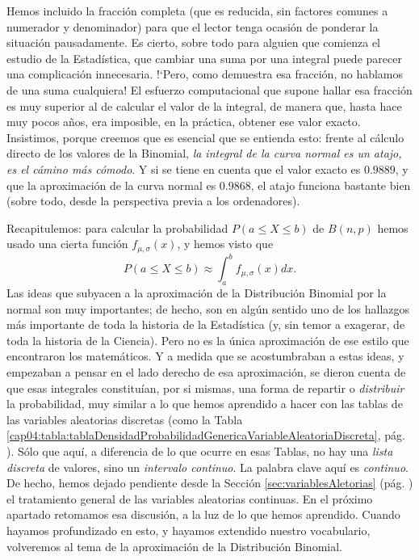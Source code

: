 Hemos incluido la fracción completa (que es reducida, sin factores comunes a numerador y denominador) para que el lector tenga ocasión de ponderar la situación pausadamente. Es cierto, sobre todo para alguien que comienza el estudio de la Estadística, que cambiar una suma por una integral puede parecer una complicación innecesaria. {!`}Pero, como demuestra esa fracción, no hablamos de una suma cualquiera! El esfuerzo computacional que supone hallar esa fracción es muy superior al de calcular el valor de la integral, de manera que, hasta hace muy pocos años, era imposible, en la práctica, obtener ese valor exacto. Insistimos, porque creemos que es esencial que se entienda esto: frente al cálculo directo de los valores de la Binomial, {\em la integral de la curva normal es un atajo, es el cámino más cómodo}. Y si se tiene en cuenta que el valor exacto es $0.9889$, y que la aproximación de la curva normal es $0.9868$, el atajo funciona bastante bien (sobre todo, desde la perspectiva previa a los ordenadores).


Recapitulemos: para calcular la probabilidad $P(a\leq X\leq b)$ de $B(n,p)$ hemos usado una cierta función $f_{\mu,\sigma}(x)$, y hemos visto que
    \[P(a\leq X\leq b)\approx \int_a^b f_{\mu,\sigma}(x)dx.\]
Las ideas que subyacen a la aproximación de la Distribución Binomial por la normal son muy importantes; de hecho, son en algún sentido uno de los hallazgos más importante de toda la historia de la Estadística (y, sin temor a exagerar, de toda la historia de la Ciencia). Pero no es la única aproximación de ese estilo que encontraron los matemáticos. Y a medida que se acostumbraban a estas ideas, y empezaban a pensar en el lado derecho de esa aproximación, se dieron cuenta de que esas integrales constituían, por si mismas, una forma de repartir o {\em distribuir} la probabilidad, muy similar a lo que hemos aprendido a hacer con las tablas de las variables aleatorias discretas (como la Tabla \ref{cap04:tabla:tablaDensidadProbabilidadGenericaVariableAleatoriaDiscreta}, pág. \pageref{cap04:tabla:tablaDensidadProbabilidadGenericaVariableAleatoriaDiscreta}). Sólo que aquí, a diferencia de lo que ocurre en esas Tablas, no hay una {\em lista discreta} de valores, sino un {\em intervalo continuo}. La palabra clave aquí es {\em continuo}. De hecho, hemos dejado pendiente desde la Sección \ref{sec:variablesAletorias} (pág. \pageref{sec:variablesAletorias}) el tratamiento general de las variables aleatorias continuas. En el próximo apartado retomamos esa discusión, a la luz de lo que hemos aprendido. Cuando hayamos profundizado en esto, y hayamos extendido nuestro vocabulario, volveremos al tema de la aproximación de la Distribución Binomial.

